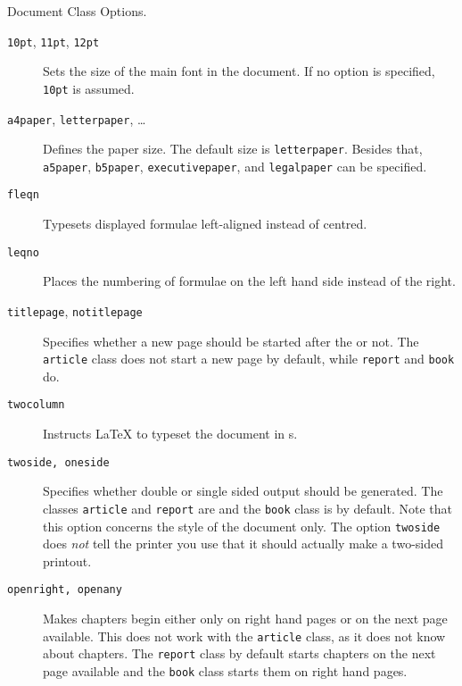 \begin{table}[!bp]
\caption{Document Class Options.} \label{options}
\begin{lined}{12cm}
\begin{flushleft}
\begin{description}
\item[\normalfont\texttt{10pt}, \texttt{11pt}, \texttt{12pt}] \quad Sets the size
  of the main font in the document. If no option is specified,
  \texttt{10pt} is assumed.  
\item[\normalfont\texttt{a4paper}, \texttt{letterpaper}, \ldots] \quad Defines
  the paper size. The default size is \texttt{letterpaper}. Besides
  that, \texttt{a5paper}, \texttt{b5paper}, \texttt{executivepaper},
  and \texttt{legalpaper} can be specified.  
   

\item[\normalfont\texttt{fleqn}] \quad Typesets displayed formulae left-aligned
  instead of centred.

\item[\normalfont\texttt{leqno}] \quad Places the numbering of formulae on the
  left hand side instead of the right.

\item[\normalfont\texttt{titlepage}, \texttt{notitlepage}] \quad Specifies
  whether a new page should be started after the 
  or not. The \texttt{article} class does not start a new page by
  default, while \texttt{report} and \texttt{book} do.  

\item[\normalfont\texttt{twocolumn}] \quad Instructs \LaTeX{} to typeset the
  document in s.

\item[\normalfont\texttt{twoside, oneside}] \quad Specifies whether double or
  single sided output should be generated. The classes
  \texttt{article} and \texttt{report} are  and the
  \texttt{book} class is  by default. Note that this
  option concerns the style of the document only. The option
  \texttt{twoside} does \emph{not} tell the printer you use that it
  should actually make a two-sided printout.

\item[\normalfont\texttt{openright, openany}] \quad Makes chapters begin either
  only on right hand pages or on the next page available. This does
  not work with the \texttt{article} class, as it does not know about
  chapters. The \texttt{report} class by default starts chapters on
  the next page available and the \texttt{book} class starts them on
  right hand pages.

\end{description}
\end{flushleft}
\end{lined}
\end{table}

